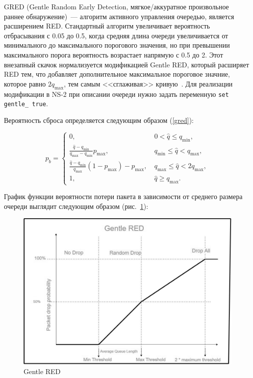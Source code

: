 GRED (Gentle Random Early Detection, мягкое/аккуратное произвольное
раннее обнаружение)~--- алгоритм активного управления очередью,
является расширением RED.  Стандартный алгоритм увеличивает
вероятность отбрасывания с 0.05 до 0.5, когда средняя длина очереди
увеличивается от минимального до максимального порогового значения, но
при превышении максимального порога вероятность возрастает напрямую с
0.5 до 2.  Этот внезапный скачок нормализуется модификацией Gentle
RED, который расширяет RED тем, что добавляет дополнительное
максимальное пороговое значние, которое равно $2q_{\max}$, тем самым
<<сглаживая>> кривую~\cite{GRED}. Для реализации модификации в NS-2
при описании очереди нужно задать переменную \verb|set gentle_ true|.

Вероятность сброса определяется следующим образом (\ref{gred}):

\begin{equation}
\label{gred}
p_{b} =\begin{cases}
        0, &  \  0 < \hat{q} \leqslant q_{\min}, 
        \\
        \frac{\hat{q} - q_{\min}}{q_{\max} - q_{\min}} p_{\max}, & \ q_{\min} \leqslant \hat{q} < q_{\max}, 
        \\
        \frac{\hat{q} - q_{\min}}{q_{\max}}(1-p_{\max}) - p_{\max}, & \ q_{\max} \leqslant \hat{q} < 2q_{\max}, 
        \\
        1, &  \ \hat{q} \geqslant  q_{\max}.
\end{cases}
\end{equation}

График функции вероятности потери пакета в зависимости от среднего
размера очереди выглядит следующим образом (рис.~\ref{fig:2.2}):

\begin{figure}[!h]
  \centering
  \includegraphics[width=0.7\linewidth]{image/GentleRED.jpg}
  \caption{Gentle RED}
  \label{fig:2.2}
\end{figure}

